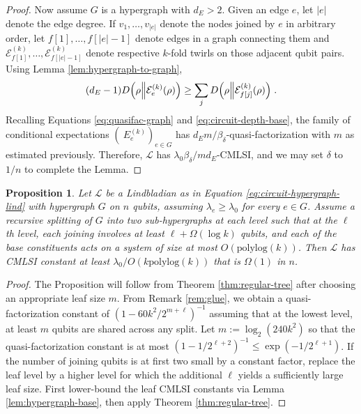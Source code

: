 \documentclass[11pt,reqno]{amsart}
\newtheorem{prop}[lemma]{Proposition}
\newcommand{\E}{\mathcal{E}}
\newcommand{\pl}{\hspace{.1cm}}
\renewcommand{\L}{\mathcal{L}}
\begin{document}
\begin{proof}
   Now assume $G$ is a hypergraph with $d_E > 2$. Given an edge $e$, let $|e|$ denote the edge degree. If $v_1, \dots, v_{|e|}$ denote the nodes joined by $e$ in arbitrary order, let $f[1], \dots, f[|e|-1]$ denote edges in a graph connecting them and $\E^{(k)}_{f[1]}, \dots, \E^{(k)}_{f[|e|-1]}$ denote respective $k$-fold twirls on those adjacent qubit pairs. Using Lemma \ref{lem:hypergraph-to-graph},
   \begin{equation}
       (d_E-1) D \Big (\rho \Big  \| \E_e^{(k)}(\rho) \Big )
        \geq \sum_j D \Big (\rho \Big \| \E_{f[j]}^{(k)}(\rho) \Big ) \pl.
   \end{equation}
    Recalling Equations \eqref{eq:quasifac-graph} and \eqref{eq:circuit-depth-base}, the family of conditional expectations $(\
    E_e^{(k)})_{e \in G}$ has $d_E m / \beta_\delta$-quasi-factorization with $m$ as estimated previously. Therefore, $\L$ has $\lambda_0 \beta_{\delta}/m d_E$-CMLSI, and we may set $\delta$ to $1/n$ to complete the Lemma.
\end{proof}

\begin{prop} \label{prop:lindbladian-recur}
    Let $\L$ be a Lindbladian as in Equation \eqref{eq:circuit-hypergraph-lind} with hypergraph $G$ on $n$ qubits, assuming $\lambda_e \geq \lambda_0$ for every $e \in G$. Assume a recursive splitting of $G$ into two sub-hypergraphs at each level such that at the $\ell$th level, each joining involves at least $\ell + \Omega(\log k)$ qubits, and each of the base constituents acts on a system of size at most $O(\mathrm{polylog}(k))$. Then $\L$ has CMLSI constant at least $\lambda_0 / O(k \mathrm{polylog}(k))$ that is $\Omega(1)$ in $n$.
\end{prop}
\begin{proof}
    The Proposition will follow from Theorem \ref{thm:regular-tree} after choosing an appropriate leaf size $m$. From Remark \ref{rem:glue}, we obtain a quasi-factorization constant of $(1 - 60 k^2 / 2^{m + \ell})^{-1}$ assuming that at the lowest level, at least $m$ qubits are shared across any split. Let $m := \log_2 (240 k^2)$ so that the quasi-factorization constant is at most $(1 - 1/2^{\ell+2})^{-1} \leq \exp(- 1 / 2^{\ell+1})$. If the number of joining qubits is at first two small by a constant factor, replace the leaf level by a higher level for which the additional $\ell$ yields a sufficiently large leaf size. First lower-bound the leaf CMLSI constants via Lemma \ref{lem:hypergraph-base}, then apply Theorem \ref{thm:regular-tree}.
\end{proof}
\end{document}
